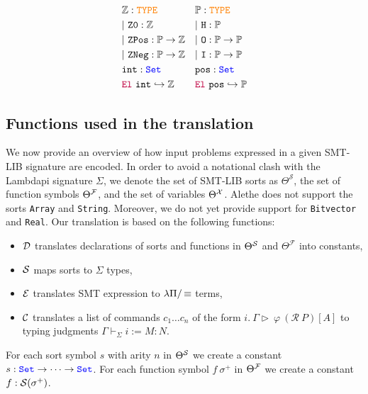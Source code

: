 \begin{align*}
&\mathbb{Z}: \type & &\mathbb{P}: \type \\
&|~\tt{Z0}: \mathbb{Z} & &|~\tt{H} : \mathbb{P} \\
&|~\tt{ZPos}: \mathbb{P} \ra \mathbb{Z} & &|~\tt{O}: \mathbb{P} \ra \mathbb{P} \\
&|~\tt{ZNeg}: \mathbb{P} \ra \mathbb{Z} & &|~\tt{I}: \mathbb{P} \ra \mathbb{P} \\
&\tt{int}: \set & &\tt{pos}: \set \\
&\el~\tt{int} \re \mathbb{Z} & &\el~\tt{pos} \re \mathbb{P} \\
\end{align*}

\subsection{Functions used in the translation}

We now provide an overview of how input problems expressed in a given SMT-LIB signature \cite[\S 5.2.1]{smtlib} are encoded. 
In order to avoid a notational clash with the Lambdapi signature $\Sigma$, we denote the set of SMT-LIB sorts as $\Theta^\mathcal{S}$, the set of function symbols $\Theta^\cal{F}$, and the set of variables $\Theta^\cal{X}$.
Alethe does not support the sorts \texttt{Array} and \texttt{String}. Moreover, we do not yet provide support for \texttt{Bitvector} and \texttt{Real}. Our translation is based on the following functions:

\begin{itemize}
\item $\cal{D}$ translates declarations of sorts and functions in $\Theta^\cal{S}$ and $\Theta^\mathcal{F}$ into constants,
\item $\cal{S}$ maps sorts to $\Sigma$ types,
\item $\cal{E}$ translates SMT expression to $\lpm$ terms,
\item $\cal{C}$ translates a list of commands  $c_1 \dots c_n$ of the form $i.~\Gamma \triangleright~\varphi~(\mathcal{R}~P)[A]$ to typing judgments $\Gamma \vdash_\Sigma i := M: N$.
\end{itemize}

\begin{definition}
For each sort symbol $s$ with arity $n$ in $\Theta^\cal{S}$ we create a constant $s: \set \ra \dots \ra \set$.
For each function symbol $f~\sigma^+$ in $\Theta^\cal{F}$ we create a constant $f: \cal{S}(\sigma^+)$.
\end{definition}

